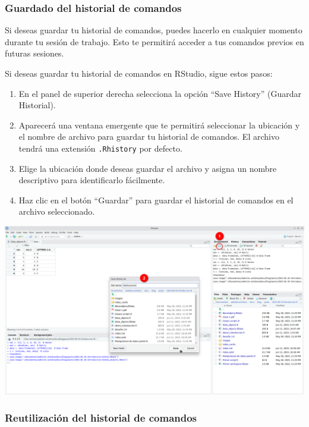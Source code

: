 \documentclass[
  letterpaper,
  DIV=11,
  numbers=noendperiod]{scrartcl}
\providecommand{\tightlist}{%
  \setlength{\itemsep}{0pt}\setlength{\parskip}{0pt}}\usepackage{longtable,booktabs,array}
\begin{document}
\hypertarget{guardado-del-historial-de-comandos}{%
\subsubsection{Guardado del historial de
comandos}\label{guardado-del-historial-de-comandos}}

Si deseas guardar tu historial de comandos, puedes hacerlo en cualquier
momento durante tu sesión de trabajo. Esto te permitirá acceder a tus
comandos previos en futuras sesiones.

Si deseas guardar tu historial de comandos en RStudio, sigue estos
pasos:

\begin{enumerate}
\def\labelenumi{\arabic{enumi}.}
\tightlist
\item
  En el panel de superior derecha selecciona la opción ``Save History''
  (Guardar Historial).
\item
  Aparecerá una ventana emergente que te permitirá seleccionar la
  ubicación y el nombre de archivo para guardar tu historial de
  comandos. El archivo tendrá una extensión \texttt{.Rhistory} por
  defecto.
\item
  Elige la ubicación donde deseas guardar el archivo y asigna un nombre
  descriptivo para identificarlo fácilmente.
\item
  Haz clic en el botón ``Guardar'' para guardar el historial de comandos
  en el archivo seleccionado.
\end{enumerate}

\includegraphics{images/Screenshot_20230611_102856.png}

\hypertarget{reutilizaciuxf3n-del-historial-de-comandos}{%
\subsubsection{Reutilización del historial de
comandos}\label{reutilizaciuxf3n-del-historial-de-comandos}}
\end{document}
